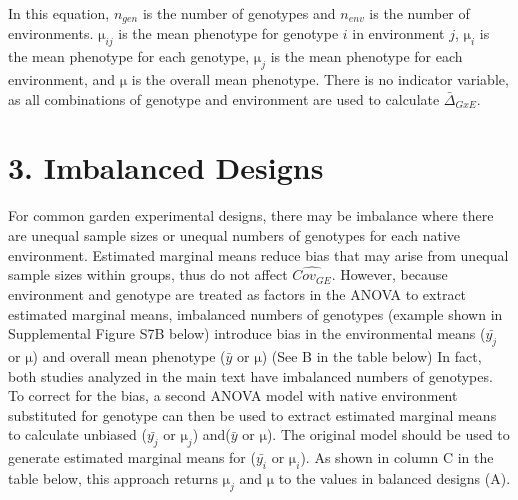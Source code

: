 \documentclass[11pt, oneside]{amsart}
\begin{document}
In this equation, $n_{gen}$ is the number of genotypes and $n_{env}$ is the number of environments. $\si\micro_{ij}$ is the mean phenotype for genotype $i$ in environment $j$, $\si\micro_{i}$ is the mean phenotype for each genotype, $\si\micro_{j}$ is the mean phenotype for each environment, and $\si\micro$ is the overall mean phenotype. There is no indicator variable, as all combinations of genotype and environment are used to calculate $ \bar\Delta_{GxE}$.

\clearpage
\newpage

\section{3. Imbalanced Designs}

For common garden experimental designs, there may be imbalance where there are unequal sample sizes or unequal numbers of genotypes for each native environment. Estimated marginal means reduce bias that may arise from unequal sample sizes within groups, thus do not affect $\hat{Cov_{GE}}$. However, because environment and genotype are treated as factors in the ANOVA to extract estimated marginal means, imbalanced numbers of genotypes (example shown in Supplemental Figure S7B below) introduce bias in the environmental means ($\bar{y_j}$ or $\si\micro$) and overall mean phenotype ($\bar{y}$ or $\si\micro$) (See B in the table below)  In fact, both studies analyzed in the main text have imbalanced numbers of genotypes. To correct for the bias, a second ANOVA model with native environment substituted for genotype can then be used to extract estimated marginal means to calculate unbiased ($\bar{y_{j}}$ or $\si\micro_{j}$) and($\bar{y}$ or $\si\micro$). The original model should be used to generate estimated marginal means for  ($\bar{y_{i}}$ or $\si\micro_{i}$). As shown in column C in the table below, this approach returns $\si\micro_{j}$ and $\si\micro$ to the values in balanced designs (A). 
\end{document}
